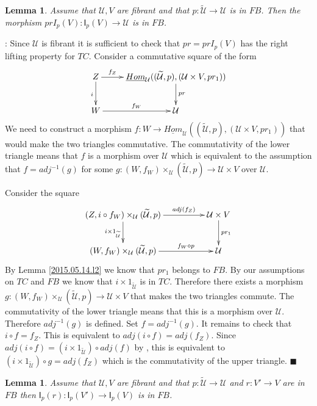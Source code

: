 \documentclass[12pt]{article}
\numberwithin{equation}{section}
\newenvironment{myproof}{{\bf Proof}:}{$\blacksquare$ \vskip 5mm }
\newtheorem{lemma}[proposition]{Lemma}
\newcommand{\llabel}[1]{\label{#1}}
\newcommand{\sr}{\rightarrow}
\newcommand{\uu}{\underline}
\newcommand{\iHom}{\uu{Hom}}
\newcommand{\wt}{\widetilde}
\newcommand{\dd}{\diamond}
\newcommand{\id}{1}            %
\newcommand{\U}{\mathcal{U}}
\newcommand{\I}{\mathsf{I}}
\begin{document}
%
\begin{lemma}
\llabel{2015.05.14.l1} Assume that $\U,V$ are fibrant and that $p:\wt{\U}\sr \U$
is in $FB$. Then the morphism $prI_p(V):\I_p(V)\sr \U$ is in $FB$.
\end{lemma}
%
\begin{myproof}
Since $\U$ is fibrant it is sufficient to check that $pr=prI_p(V)$ has the right
lifting property for $TC$. Consider a commutative square of the form
%
$$
\begin{xy}
          \xymatrix@C=2pc{ Z \ar[r]^-{f_Z} \ar[d]_{i} &
            \iHom_\U((\wt{\U},p),(\U\times V,pr_1)) \ar[d]^{pr}\\ W
            \ar[r]^-{f_W} & \U }
\end{xy}
$$
%
We need to construct a morphism $f:W\sr \iHom_\U((\wt{\U},p),(\U\times
V,pr_1))$ that would make the two triangles commutative. The commutativity of
the lower triangle means that $f$ is a morphism over $\U$ which is equivalent to
the assumption that $f=adj^{-1}(g)$ for some $g:(W,f_W)\times_\U (\wt{\U},p)\sr
\U\times V$ over $\U$.

Consider the square
%
$$
\begin{xy}
          \xymatrix@C=4pc{ (Z, i\circ f_W)\times_\U (\wt{\U},p)
            \ar[r]^-{adj(f_Z)} \ar[d]_{i\times \id_{\wt{\U}}} & \U\times V
            \ar[d]^{pr_1}\\ (W,f_W)\times_\U (\wt{\U},p) \ar[r]^-{f_W\dd p} & \U }
\end{xy}
$$
%
By Lemma \ref{2015.05.14.l2} we know that $pr_1$ belongs to $FB$. By our
assumptions on $TC$ and $FB$ we know that $i\times \id_{\wt{\U}}$ is in
$TC$. Therefore there exists a morphism $g:(W,f_W)\times_\U (\wt{\U},p) \sr
\U\times V$ that makes the two triangles commute.  The commutativity of the
lower triangle means that this is a morphism over $\U$. Therefore $adj^{-1}(g)$
is defined. Set $f=adj^{-1}(g)$. It remains to check that $i\circ f=f_Z$. This
is equivalent to $adj(i\circ f)=adj(f_Z)$. Since $adj(i\circ f)=(i\times
\id_{\wt{\U}})\circ adj(f)$ by \cite[Lemma 8.7(3)]{fromunivwithPi}, this is
equivalent to $(i\times \id_{\wt{\U}})\circ g=adj(f_Z)$ which is the
commutativity of the upper triangle.
\end{myproof}
%
\begin{lemma}
\llabel{2015.05.14.l3} Assume that $\U,V$ are fibrant and that $p:\wt{\U}\sr \U$
and $r:V'\sr V$ are in $FB$ then $\I_p(r):\I_p(V')\sr \I_p(V)$ is in $FB$.
\end{lemma}
%
\end{document}
